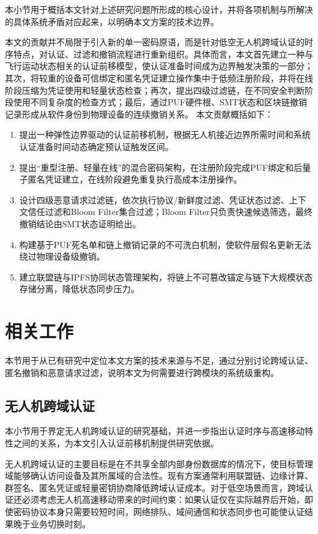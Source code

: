 \documentclass[conference]{IEEEtran}
\begin{document}
	本小节用于概括本文针对上述研究问题所形成的核心设计，并将各项机制与所解决的具体系统矛盾对应起来，以明确本文方案的技术边界。
	
	本文的贡献并不局限于引入新的单一密码原语，而是针对低空无人机跨域认证的时序特点，对认证、过滤和撤销流程进行重新组织。具体而言，本文首先建立一种与飞行运动状态相关的认证前移模型，使认证准备时间成为边界触发决策的一部分；其次，将较重的设备可信绑定和匿名凭证建立操作集中于低频注册阶段，并将在线阶段压缩为凭证使用和轻量状态检查；再次，提出四级过滤链，在不同安全判断阶段使用不同复杂度的检查方式；最后，通过PUF硬件根、SMT状态和区块链撤销记录形成从软件身份到物理设备的连续撤销关系。
	本文贡献概括如下：
	\begin{enumerate}
		\item 提出一种弹性边界驱动的认证前移机制，根据无人机接近边界所需时间和系统认证准备时间动态确定预认证触发区间。
		\item 提出“重型注册、轻量在线”的混合密码架构，在注册阶段完成PUF绑定和后量子匿名凭证建立，在线阶段避免重复执行高成本注册操作。
		\item 设计四级恶意请求过滤链，依次执行协议/新鲜度过滤、凭证状态过滤、上下文信任过滤和Bloom Filter集合过滤；Bloom Filter只负责快速候选筛选，最终撤销结论由SMT状态证明给出。
		\item 构建基于PUF死名单和链上撤销记录的不可洗白机制，使软件层假名更新无法绕过物理设备级撤销。
		\item 建立联盟链与IPFS协同状态管理架构，将链上不可篡改锚定与链下大规模状态存储分离，降低状态同步压力。
	\end{enumerate}
	
	\section{相关工作}
	
	本节用于从已有研究中定位本文方案的技术来源与不足，通过分别讨论跨域认证、匿名撤销和恶意请求过滤，说明本文为何需要进行跨模块的系统级重构。
	
	
	\subsection{无人机跨域认证}
	
	本小节用于界定无人机跨域认证的研究基础，并进一步指出认证时序与高速移动特性之间的关系，为本文引入认证前移机制提供研究依据。
	
	无人机跨域认证的主要目标是在不共享全部内部身份数据库的情况下，使目标管理域能够确认访问设备及其所属域的合法性。现有方案通常利用联盟链、边缘计算、群签名、匿名凭证或轻量密钥协商降低跨域认证成本。对于低空场景而言，跨域认证还必须考虑无人机高速移动带来的时间约束：如果认证仅在实际越界后开始，即使密码协议本身只需要较短时间，网络排队、域间通信和状态同步也可能使认证结果晚于业务切换时刻。
	
\end{document}
